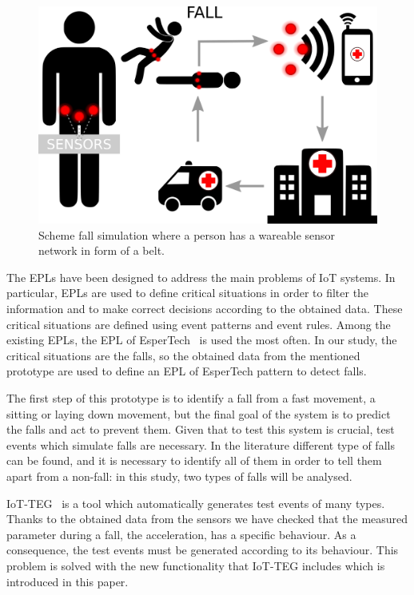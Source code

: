 \documentclass[journal]{IEEEtran}
\begin{document}
\begin{figure}[!ht]
  \centering
  \includegraphics[scale=0.12]{img/Figure1}
  \caption[Escalation scheme]{Scheme fall simulation where a person has a wareable sensor network in form of a belt.~\cite{LaBlunda.2016,LaBlunda.2016b}}
  \label{fig:escalationscheme}
\end{figure}

The EPLs have been designed to address the main problems of 
IoT systems. In particular, EPLs are used to define critical situations in order to filter the 
information and to make correct decisions according to the obtained data. These critical 
situations are defined using event patterns and event rules. Among the existing EPLs, the 
EPL of EsperTech~\cite{Esper:2016} is used the most often. In our study, the critical situations are the falls,
so the obtained data from the mentioned prototype are used to define an EPL of EsperTech 
pattern to detect falls.

The first step of this prototype is to identify a fall from a fast movement, a sitting or laying 
down movement, but the final goal of the system is to predict the falls and act to prevent 
them. Given that to test this system is crucial, test events which simulate falls are necessary. In 
the literature different type of falls can be found, and it is necessary to identify all of them in 
order to tell them apart from a non-fall: in this study, two types of falls will be analysed. 

IoT-TEG~\cite{TesisGutierrez2017,Gutierrez2017} is a tool which automatically generates test events 
of many types. Thanks to the obtained data from the sensors we have checked that the measured 
parameter during a fall, the acceleration, has a specific behaviour. As a consequence, the test events 
must be generated according to its behaviour. This problem is solved with the new functionality that 
IoT-TEG includes which is introduced in this paper. %
\end{document}
